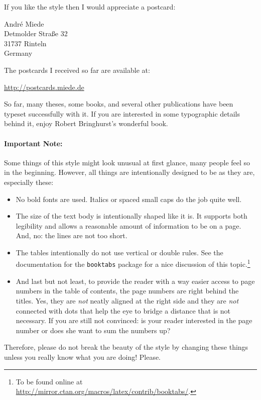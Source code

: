 If you like the style then I would appreciate a postcard:
\begin{center}
    André Miede \\
    Detmolder Straße 32 \\
    31737 Rinteln \\
    Germany
\end{center}
The postcards I received so far are available at:
\begin{center}
    \url{http://postcards.miede.de}
\end{center}
So far, many theses, some books, and several other publications have
been typeset successfully with it. If you are interested in some
typographic details behind it, enjoy Robert Bringhurst's wonderful book.

\paragraph{Important Note:} Some things of this style might look
unusual at first glance, many people feel so in the beginning.
However, all things are intentionally designed to be as they are,
especially these:
\begin{itemize}
    \item No bold fonts are used. Italics or spaced small caps do the
    job quite well.
    \item The size of the text body is intentionally shaped like it
    is. It supports both legibility and allows a reasonable amount of
    information to be on a page. And, no: the lines are not too short.
    \item The tables intentionally do not use vertical or double
    rules. See the documentation for the \texttt{booktabs} package for
    a nice discussion of this topic.\footnote{To be found online at
    \url{http://mirror.ctan.org/macros/latex/contrib/booktabs/}.}
    \item And last but not least, to provide the reader with a way
    easier access to page numbers in the table of contents, the page
    numbers are right behind the titles. Yes, they are \emph{not}
    neatly aligned at the right side and they are \emph{not} connected
    with dots that help the eye to bridge a distance that is not
    necessary. If you are still not convinced: is your reader
    interested in the page number or does she want to sum the numbers
    up?
\end{itemize}
Therefore, please do not break the beauty of the style by changing
these things unless you really know what you are doing! Please.

